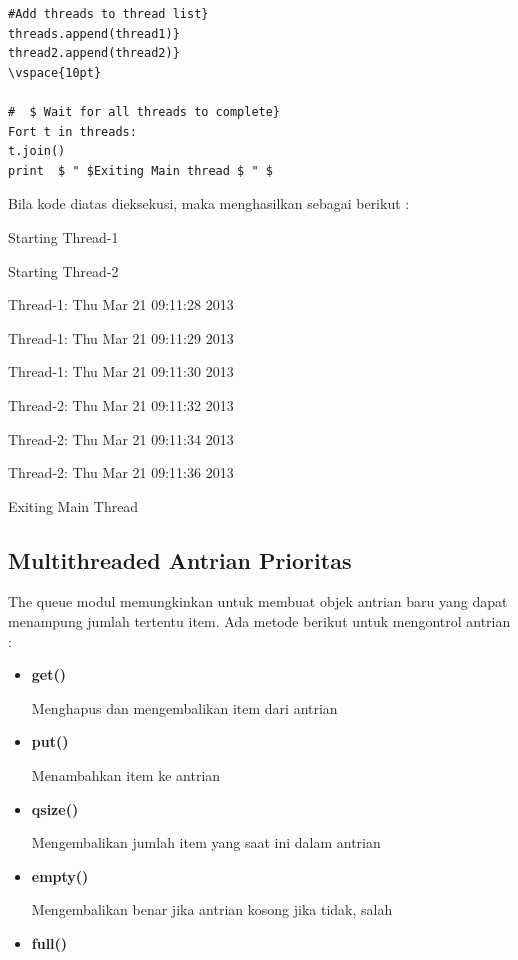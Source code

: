 \begin{itemize}
\begin{verbatim}
#Add threads to thread list} 
threads.append(thread1)} 
thread2.append(thread2)} 
\vspace{10pt}
 
#  $ Wait for all threads to complete}  
Fort t in threads:
t.join()
print  $ " $Exiting Main thread $ " $
\end{verbatim}

\vspace{8pt}
Bila kode diatas dieksekusi, maka menghasilkan sebagai berikut : 

{\fontsize{10pt}{10pt}\selectfont Starting Thread-1} 
 
{\fontsize{10pt}{10pt}\selectfont Starting Thread-2} 
 
{\fontsize{10pt}{10pt}\selectfont Thread-1: Thu Mar 21 09:11:28 2013} 
 
{\fontsize{10pt}{10pt}\selectfont Thread-1: Thu Mar 21 09:11:29 2013} 
 
{\fontsize{10pt}{10pt}\selectfont Thread-1: Thu Mar 21 09:11:30 2013} 
 
{\fontsize{10pt}{10pt}\selectfont Thread-2: Thu Mar 21 09:11:32 2013} 
 
{\fontsize{10pt}{10pt}\selectfont Thread-2: Thu Mar 21 09:11:34 2013} 
 
{\fontsize{10pt}{10pt}\selectfont Thread-2: Thu Mar 21 09:11:36 2013} 
 
{\fontsize{10pt}{10pt}\selectfont Exiting Main Thread} 

\vspace{8pt}
\subsection{Multithreaded Antrian Prioritas} 
\hspace*{0.5in} The queue modul memungkinkan untuk membuat objek antrian baru yang dapat menampung jumlah tertentu item. Ada metode berikut untuk mengontrol antrian : 
\begin{itemize}
\item \textbf{get()} 

Menghapus dan mengembalikan item dari antrian
\item \textbf{put()} 

Menambahkan item ke antrian	
\item \textbf{qsize()} 
	
Mengembalikan jumlah item yang saat ini dalam antrian
\item \textbf{empty()} 

Mengembalikan benar jika antrian kosong jika tidak, salah
\item \textbf{full()}


\end{itemize}
\end{itemize}
